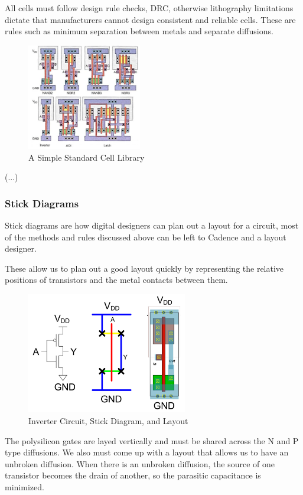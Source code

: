 \documentclass{article}
\begin{document}
All cells must follow design rule checks, DRC, otherwise lithography limitations dictate that manufacturers cannot design consistent and reliable cells. These are rules such as minimum separation between metals and separate diffusions.

\begin{figure}[ht!]
\centering
\includegraphics[width=50mm]{STD.png}
\caption{A Simple Standard Cell Library}
\end{figure}

(...)

\subsubsection{Stick Diagrams}

Stick diagrams are how digital designers can plan out a layout for a circuit, most of the methods and rules discussed above can be left to Cadence and a layout designer. 

These allow us to plan out a good layout quickly by representing the relative positions of transistors and the metal contacts between them. 


\begin{figure}[ht!]
\centering
\includegraphics[width=70mm]{lyt.png}
\caption{Inverter Circuit, Stick Diagram, and Layout}
\end{figure}

The polysilicon gates are layed vertically and must be shared across the N and P type diffusions. We also must come up with a layout that allows us to have an unbroken diffusion. When there is an unbroken diffusion, the source of one transistor becomes the drain of another, so the parasitic capacitance is minimized.
\end{document}
